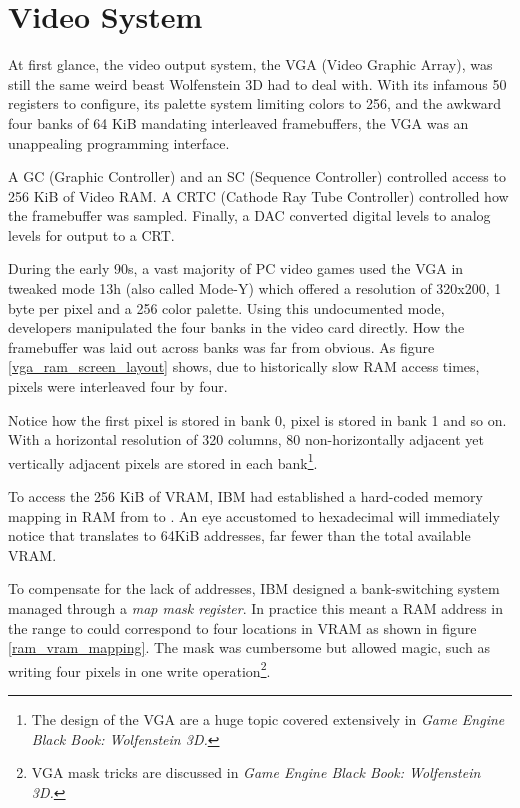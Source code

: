 \section{Video System}
At first glance, the video output system, the VGA (Video Graphic Array), was still the same weird beast Wolfenstein 3D had to deal with. With its infamous 50 registers to configure, its palette system limiting colors to 256, and the awkward four banks of 64 KiB mandating interleaved framebuffers, the VGA was an unappealing programming interface.\\
\par
A GC (Graphic Controller) and an SC (Sequence Controller) controlled access to 256 KiB of Video RAM. A CRTC (Cathode Ray Tube Controller) controlled how the framebuffer was sampled. Finally, a DAC converted digital levels to analog levels for output to a CRT.\\
\par 	
{}
\par
During the early 90s, a vast majority of PC video games used the VGA in tweaked mode 13h (also called Mode-Y) which offered a resolution of 320x200, 1 byte per pixel and a 256 color palette. Using this undocumented mode, developers manipulated the four banks in the video card directly. How the framebuffer was laid out across banks was far from obvious. As figure \ref{vga_ram_screen_layout} shows, due to historically slow RAM access times, pixels were interleaved four by four.




\par

Notice how the first pixel  is stored in bank 0, pixel  is stored in bank 1 and so on. With a horizontal resolution of 320 columns, 80 non-horizontally adjacent yet vertically adjacent pixels are stored in each bank\footnote{The design of the VGA are a huge topic covered extensively in \it{Game Engine Black Book: Wolfenstein 3D}.}.\\
\par
To access the 256 KiB of VRAM, IBM had established a hard-coded memory mapping in RAM from  to . An eye accustomed to hexadecimal will immediately notice that  translates to 64KiB addresses, far fewer than the total available VRAM.\\
\par
 To compensate for the lack of addresses, IBM designed a bank-switching system managed through a \textit{map mask register}. In practice this meant a RAM address in the range  to  could correspond to four locations in VRAM as shown in figure \ref{ram_vram_mapping}. The mask was cumbersome but allowed magic, such as writing four pixels in one write operation\footnote{VGA mask tricks are discussed in \it{Game Engine Black Book: Wolfenstein 3D}.}.

